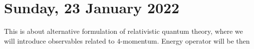 \documentclass[main.tex]{subfiles}
\begin{document}
%
%
%
%
%

\section{Sunday, 23 January 2022}

This is about alternative formulation of relativistic quantum theory, where we will introduce observables related to $4$-momentum. Energy operator will be then 
\end{document}
